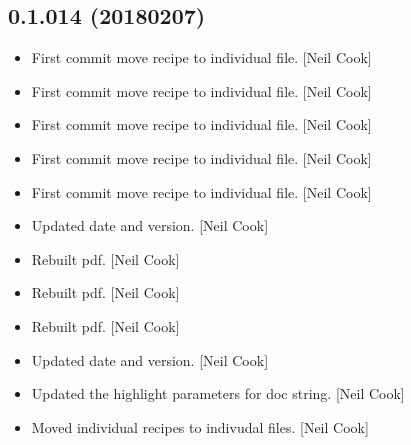 \documentclass[a4paper,10pt,english]{report}
\begin{document}
\subsection{0.1.014 (2018\sphinxhyphen{}02\sphinxhyphen{}07)}
\label{\detokenize{misc/changelog:id508}}\begin{itemize}
\item {} 
First commit \sphinxhyphen{} move recipe to individual file. {[}Neil Cook{]}

\item {} 
First commit \sphinxhyphen{} move recipe to individual file. {[}Neil Cook{]}

\item {} 
First commit \sphinxhyphen{} move recipe to individual file. {[}Neil Cook{]}

\item {} 
First commit \sphinxhyphen{} move recipe to individual file. {[}Neil Cook{]}

\item {} 
First commit \sphinxhyphen{} move recipe to individual file. {[}Neil Cook{]}

\item {} 
Updated date and version. {[}Neil Cook{]}

\item {} 
Rebuilt pdf. {[}Neil Cook{]}

\item {} 
Rebuilt pdf. {[}Neil Cook{]}

\item {} 
Rebuilt pdf. {[}Neil Cook{]}

\item {} 
Updated date and version. {[}Neil Cook{]}

\item {} 
Updated the highlight parameters for doc string. {[}Neil Cook{]}

\item {} 
Moved individual recipes to indivudal files. {[}Neil Cook{]}

\end{itemize}
\end{document}
